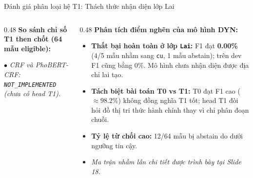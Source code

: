 \documentclass[aspectratio=169, 9pt]{beamer}
\begin{document}
\begin{frame}{Đánh giá phân loại hệ T1: Thách thức nhận diện lớp Lai}
  \vspace{-0.15cm}
  {\fontsize{8.5pt}{10.8pt}\selectfont
  \begin{columns}[T]
    \begin{column}{0.48\textwidth}
      \textbf{So sánh chỉ số T1 then chốt (64 mẫu eligible):}
      \vspace{0.1cm}
      \begin{center}
      \end{center}
      \vspace{0.1cm}
      $\bullet$ \textit{CRF và PhoBERT-CRF: \texttt{NOT\_IMPLEMENTED} (chưa có head T1).}
    \end{column}
    \begin{column}{0.48\textwidth}
      \textbf{Phân tích điểm nghẽn của mô hình DYN:}
      \begin{itemize}
        \setlength{\itemsep}{3pt}
        \item \textbf{Thất bại hoàn toàn ở lớp \texttt{Lai}:} F1 đạt \textbf{0.00\%} (4/5 mẫu nhầm sang \texttt{cu}, 1 mẫu abstain); trên dev F1 cũng bằng 0\%. Mô hình chưa nhận diện được địa chỉ lai tạo.
        \item \textbf{Tách biệt bài toán T0 vs T1:} T0 đạt F1 cao ($\approx 98.2\%$) không đồng nghĩa T1 tốt; head T1 đòi hỏi đồ thị tri thức hành chính thay vì chỉ phân đoạn chuỗi.
        \item \textbf{Tỷ lệ từ chối cao:} 12/64 mẫu bị abstain do dưới ngưỡng tin cậy.
        \item \textit{Ma trận nhầm lẫn chi tiết được trình bày tại Slide 18.}
      \end{itemize}
    \end{column}
  \end{columns}
  }
\end{frame}
\end{document}
